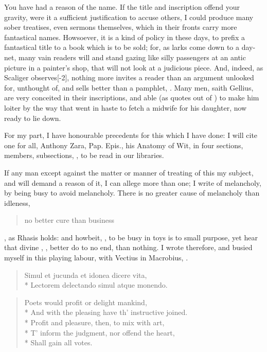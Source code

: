 {You have had a reason of the name. If the title and inscription offend
your gravity, were it a sufficient justification to accuse others, I
could produce many sober treatises, even sermons themselves, which in
their fronts carry more fantastical names. Howsoever, it is a kind of
policy in these days, to prefix a fantastical title to a book which is
to be sold; for, as larks come down to a day-net, many vain readers
will  and stand gazing like silly passengers at an antic picture
in a painter's shop, that will not look at a judicious piece. And,
indeed, as Scaliger observes[-2\baselineskip], nothing more invites a reader than an
argument unlooked for, unthought of, and sells better than a 
pamphlet, . Many men, saith
Gellius, are very conceited in their inscriptions, and able (as
\Pliny{} quotes out of \Seneca{}) to make him loiter by the way that went
in haste to fetch a midwife for his daughter, now ready to lie down.

For my part, I have honourable precedents for this which I have
done: I will cite one for all, Anthony Zara, Pap. Epis., his Anatomy of
Wit, in four sections, members, subsections, \etc, to be read in our
libraries.

If any man except against the matter or manner of treating of this my
subject, and will demand a reason of it, I can allege more than one; I
write of melancholy, by being busy to avoid melancholy.\label{mention:being-busy} There is no
greater cause of melancholy than idleness, \blockquote{no better cure than business}, as Rhasis holds: and howbeit,
, to be busy in toys is to small purpose, yet hear that
divine \Seneca, , better do to no end, than
nothing. I wrote therefore, and busied myself in this playing labour,
 with Vectius in
Macrobius, .
%
\begin{latin}%
\begin{verse}
Simul et jucunda et idonea dicere vita,\\*
Lectorem delectando simul atque monendo.
\end{verse}
\end{latin}%
\translationrule
\begin{verse}
Poets would profit or delight mankind,\\*
And with the pleasing have th' instructive joined.\\*
Profit and pleasure, then, to mix with art,\\*
T' inform the judgment, nor offend the heart,\\*
Shall gain all votes.
\end{verse}

}
